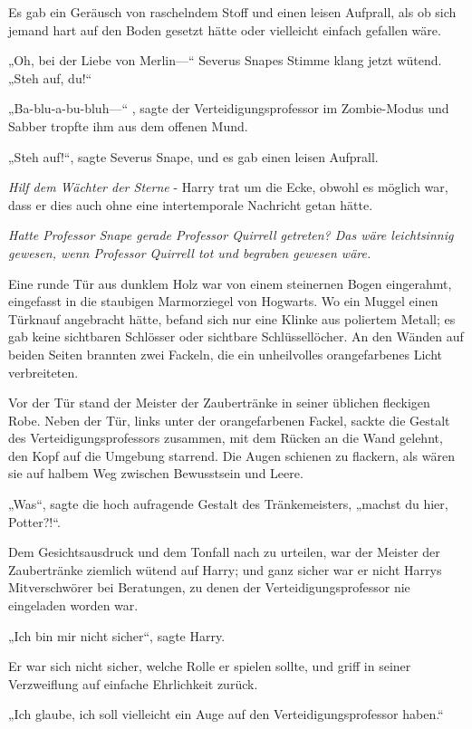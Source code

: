 {Es gab ein Geräusch von raschelndem Stoff und einen leisen Aufprall, als ob sich jemand hart auf den Boden gesetzt hätte oder vielleicht einfach gefallen wäre.

„Oh, bei der Liebe von Merlin—“ Severus Snapes Stimme klang jetzt wütend. „Steh auf, du!“

„Ba-blu-a-bu-bluh—“ , sagte der Verteidigungsprofessor im Zombie-Modus und Sabber tropfte ihm aus dem offenen Mund.

„Steh auf!“, sagte Severus Snape, und es gab einen leisen Aufprall.

\emph{Hilf dem Wächter der Sterne} - Harry trat um die Ecke, obwohl es möglich war, dass er dies auch ohne eine intertemporale Nachricht getan hätte.

\emph{Hatte Professor Snape gerade Professor Quirrell getreten? Das wäre leichtsinnig gewesen, wenn Professor Quirrell tot und begraben gewesen wäre.}

Eine runde Tür aus dunklem Holz war von einem steinernen Bogen eingerahmt, eingefasst in die staubigen Marmorziegel von Hogwarts. Wo ein Muggel einen Türknauf angebracht hätte, befand sich nur eine Klinke aus poliertem Metall; es gab keine sichtbaren Schlösser oder sichtbare Schlüssellöcher. An den Wänden auf beiden Seiten brannten zwei Fackeln, die ein unheilvolles orangefarbenes Licht verbreiteten.

Vor der Tür stand der Meister der Zaubertränke in seiner üblichen fleckigen Robe. Neben der Tür, links unter der orangefarbenen Fackel, sackte die Gestalt des Verteidigungsprofessors zusammen, mit dem Rücken an die Wand gelehnt, den Kopf auf die Umgebung starrend. Die Augen schienen zu flackern, als wären sie auf halbem Weg zwischen Bewusstsein und Leere.

„Was“, sagte die hoch aufragende Gestalt des Tränkemeisters, „machst du hier, Potter?!“.

Dem Gesichtsausdruck und dem Tonfall nach zu urteilen, war der Meister der Zaubertränke ziemlich wütend auf Harry; und ganz sicher war er nicht Harrys Mitverschwörer bei Beratungen, zu denen der Verteidigungsprofessor nie eingeladen worden war.

„Ich bin mir nicht sicher“, sagte Harry.

Er war sich nicht sicher, welche Rolle er spielen sollte, und griff in seiner Verzweiflung auf einfache Ehrlichkeit zurück.

„Ich glaube, ich soll vielleicht ein Auge auf den Verteidigungsprofessor haben.“

}
